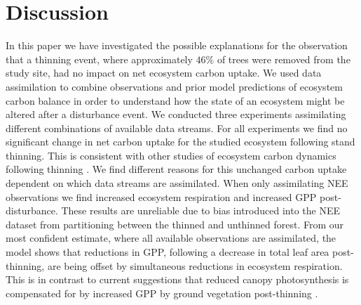\documentclass[draft,linenumbers]{agujournal}
\begin{document}
\section{Discussion}
{\color{blue}In this paper we have investigated the possible explanations for the observation that a thinning event, where approximately $46\%$ of trees were removed from the study site, had no impact on net ecosystem carbon uptake. We used data assimilation to combine observations and prior model predictions of ecosystem carbon balance in order to understand how the state of an ecosystem might be altered after a disturbance event.} We conducted three experiments assimilating different combinations of available data streams. For all experiments we find no significant change in net carbon uptake for the studied ecosystem following stand thinning. This is consistent with other studies of ecosystem carbon dynamics following thinning {\color{blue}\citep{vesala2005effect, moreaux2011paired, dore2012recovery, wilkinson2016}}. We find different reasons for this unchanged carbon uptake dependent on which data streams are assimilated. When only assimilating NEE observations we find increased ecosystem respiration and increased GPP post-disturbance. These results are unreliable due to bias introduced into the NEE dataset from partitioning between the thinned and unthinned forest. From our most confident estimate, where all available observations are assimilated, the model shows that reductions in GPP, following a decrease in total leaf area post-thinning, are being offset by simultaneous reductions in ecosystem respiration. This is in contrast to current suggestions that reduced canopy photosynthesis is compensated for by increased GPP by ground vegetation post-thinning \citep{vesala2005effect, moreaux2011paired, dore2012recovery, wilkinson2016}.

\end{document}
